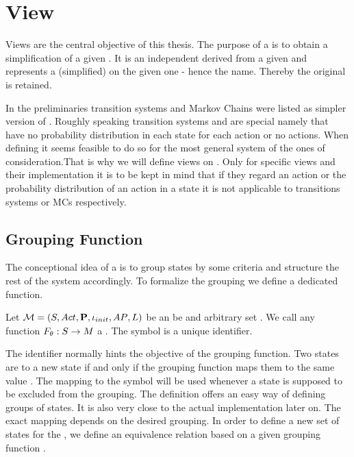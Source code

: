 \documentclass[preview]{standalone}
\begin{document}
	
\section{View}
Views are the central objective of this thesis. The purpose of a \viewN is to obtain a simplification of a given \chosengraphtypeN.  It is an independent \chosengraphtypeN derived from a given \chosengraphtypeN and represents a (simplified) \viewN on the given one - hence the name. Thereby the original \chosengraphtypeN is retained.

In the preliminaries transition systems and Markov Chains were listed as simpler version of \mdpsN. Roughly speaking transition systems and \mdpsN are special \mdpsN namely that have no probability distribution in each state for each action or no actions. When defining \viewsN it seems feasible to do so for the most general system of the ones of consideration.That is why we will define views on \mdpsN. Only for specific views and their implementation it is to be kept in mind that if they regard an action or the probability distribution of an action in a state it is not applicable to transitions systems or MCs respectively. 

\subsection{Grouping Function}
The conceptional idea of a \viewN is to group states by some criteria and structure the rest of the system accordingly. To formalize the grouping we define a dedicated function.

\begin{definition}
	Let ${{{\mathcal{M}}}} = {{({S}, {Act}, {\textbf{P}}, {\iota_{init}}, {AP}, {L})}}$ be \chosengraphtypeN an \arbset be and arbitrary set . We call any function ${F_{{\theta}}} : {S} \to {\ensuremath{{M}}}$ a \emph{\grpfctN}. The symbol \viewppty is a unique identifier.
	
	\label{def:grpfct}
\end{definition}

The identifier \viewppty normally hints the objective of the grouping function. Two states are  to a new state if and only if the grouping function maps them to the same value . The mapping to the symbol \remelem will be used whenever a state is supposed to be excluded from the grouping. The definition offers an easy way of defining groups of states. It is also very close to the actual implementation later on. The exact mapping depends on the desired grouping. In order to define a new set of states for the \viewN, we define an equivalence relation \eqrelview based on a given grouping function \grpfct.
\end{document}
